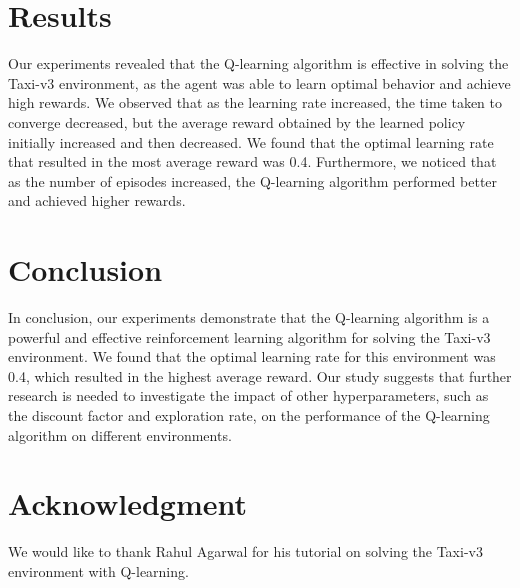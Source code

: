 \documentclass{IEEEtran}
\begin{document}
\section{Results}
Our experiments revealed that the Q-learning algorithm is effective in solving the Taxi-v3 environment, as the agent was able to learn optimal behavior and achieve high rewards. We observed that as the learning rate increased, the time taken to converge decreased, but the average reward obtained by the learned policy initially increased and then decreased. We found that the optimal learning rate that resulted in the most average reward was 0.4. Furthermore, we noticed that as the number of episodes increased, the Q-learning algorithm performed better and achieved higher rewards.

\section{Conclusion}
In conclusion, our experiments demonstrate that the Q-learning algorithm is a powerful and effective reinforcement learning algorithm for solving the Taxi-v3 environment. We found that the optimal learning rate for this environment was 0.4, which resulted in the highest average reward. Our study suggests that further research is needed to investigate the impact of other hyperparameters, such as the discount factor and exploration rate, on the performance of the Q-learning algorithm on different environments.

\section*{Acknowledgment}
We would like to thank Rahul Agarwal for his tutorial on solving the Taxi-v3 environment with Q-learning.



\end{document}

